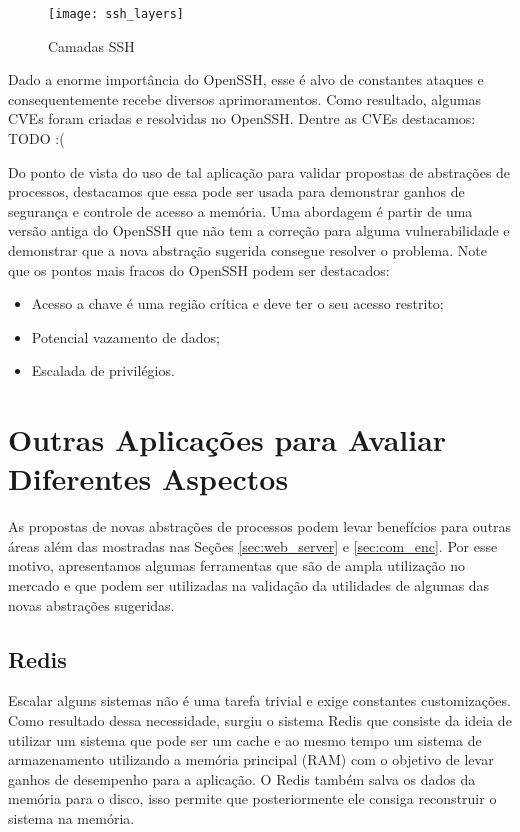 \begin{figure}[!h]
  \centering
  \texttt{[image: ssh\_layers]}
  \caption[Camadas SSH]{Camadas SSH \citep{opensshhood}}
  \label{fig:openssh_layer}
\end{figure}

Dado a enorme importância do OpenSSH, esse é alvo de constantes ataques e
consequentemente recebe diversos aprimoramentos. Como resultado, algumas CVEs
foram criadas e resolvidas no OpenSSH. Dentre as CVEs destacamos: TODO :(


Do ponto de vista do uso de tal aplicação para validar propostas de abstrações
de processos, destacamos que essa pode ser usada para demonstrar ganhos de
segurança e controle de acesso a memória. Uma abordagem é partir de uma versão
antiga do OpenSSH que não tem a correção para alguma vulnerabilidade e
demonstrar que a nova abstração sugerida consegue resolver o problema. Note que
os pontos mais fracos do OpenSSH podem ser destacados:

\begin{itemize}
  \item Acesso a chave é uma região crítica e deve ter o seu acesso restrito;
  \item Potencial vazamento de dados;
  \item Escalada de privilégios.
\end{itemize}

\section{Outras Aplicações para Avaliar Diferentes Aspectos}

As propostas de novas abstrações de processos podem levar benefícios para
outras áreas além das mostradas nas Seções \ref{sec:web_server} e
\ref{sec:com_enc}. Por esse motivo, apresentamos algumas ferramentas que são de
ampla utilização no mercado e que podem ser utilizadas na validação da
utilidades de algumas das novas abstrações sugeridas.

\subsection{Redis}

Escalar alguns sistemas não é uma tarefa trivial e exige constantes
customizações. Como resultado dessa necessidade, surgiu o sistema Redis que
consiste da ideia de utilizar um sistema que pode ser um cache e ao mesmo tempo
um sistema de armazenamento utilizando a memória principal (RAM) com o objetivo
de levar ganhos de desempenho para a aplicação. O Redis também salva os dados
da memória para o disco, isso permite que posteriormente ele consiga
reconstruir o sistema na memória.

